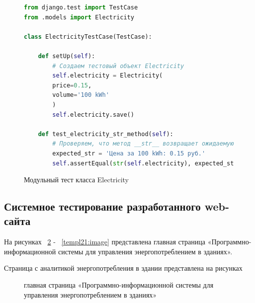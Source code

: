 \begin{figure}[ht]
\begin{lstlisting}[language=Python]
from django.test import TestCase
from .models import Electricity
	
class ElectricityTestCase(TestCase):

	def setUp(self):
		# Создаем тестовый объект Electricity
		self.electricity = Electricity(
		price=0.15,
		volume='100 kWh'
		)
		self.electricity.save()
	
	def test_electricity_str_method(self):
		# Проверяем, что метод __str__ возвращает ожидаемую строку
		expected_str = 'Цена за 100 kWh: 0.15 руб.'
		self.assertEqual(str(self.electricity), expected_str)

\end{lstlisting}  
\caption{Модульный тест класса Electricity}
\label{Electricity:image}
\end{figure}

\newpage


\subsection{Системное тестирование разработанного web-сайта}


На рисунках  ~\ref{templ11:image} - ~\ref{templ21:image} представлена главная страница  «Программно-информационной системы для управления энергопотреблением в зданиях».

Страница с аналитикой энергопотребления в здании представлена на рисунках


\begin{figure}[ht] %
\caption{главная страница  «Программно-информационной системы для управления энергопотреблением в зданиях»}
\label{templ11:image}
\end{figure}

